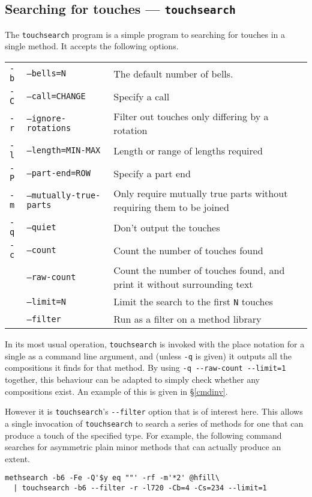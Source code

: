 \documentclass[a4paper,11pt,oneside]{book}
\makeatletter
\newcommand{\ttcmdidx}[1]{\texttt{#1}\index{#1@{\texttt{#1}}}}
\newcommand{\sref}[1]{\hyperref[#1]{\S\ref{#1}}}
\makeatother
\begin{document}
\subsection{Searching for touches — \texttt{touchsearch}}\label{touchsearch}

The \ttcmdidx{touchsearch} program is a simple program to searching for
touches in a single method.  It accepts the following options.

\begin{tabularx}{\textwidth}{llX}
\texttt{-b}&\texttt{--bells=N}&The default number of bells.\\
\texttt{-C}&\texttt{--call=CHANGE}&Specify a call\\
\texttt{-r}&\texttt{--ignore-rotations}
  &Filter out touches only differing by a rotation\\
\texttt{-l}&\texttt{--length=MIN-MAX}
  &Length or range of lengths required\\
\texttt{-P}&\texttt{--part-end=ROW}&Specify a part end\\
\texttt{-m}&\texttt{--mutually-true-parts}
  &Only require mutually true parts without requiring them to be joined\\
\texttt{-q}&\texttt{--quiet}&Don't output the touches\\
\texttt{-c}&\texttt{--count}&Count the number of touches found\\
           &\texttt{--raw-count}&
  Count the number of touches found, and print it without surrounding text\\
           &\texttt{--limit=N}&
  Limit the search to the first \texttt{N} touches\\
           &\texttt{--filter}&Run as a filter on a method library\\
\end{tabularx}

In its most usual operation, \texttt{touchsearch} is invoked with the place
notation for a single as a command line argument, and 
(unless \verb+-q+ is given) it outputs all the compositions it finds for 
that method.   By using \verb+-q --raw-count --limit=1+ together, this
behaviour can be adapted to simply check whether any compositions exist.
An example of this is given in \sref{cmdinv}.

However it is \texttt{touchsearch}'s \verb+--filter+ option that is of 
interest here.  This allows a single invocation of \texttt{touchsearch} to
search a series of methods for one that can produce a touch of the specified
type.  For example, the following command searches for asymmetric plain minor
methods that can actually produce an extent.%
\begin{Verbatim}[commandchars=@~~]
methsearch -b6 -Fe -Q'$y eq ""' -rf -m'*2' @hfill\
  | touchsearch -b6 --filter -r -l720 -Cb=4 -Cs=234 --limit=1
\end{Verbatim}
\end{document}
